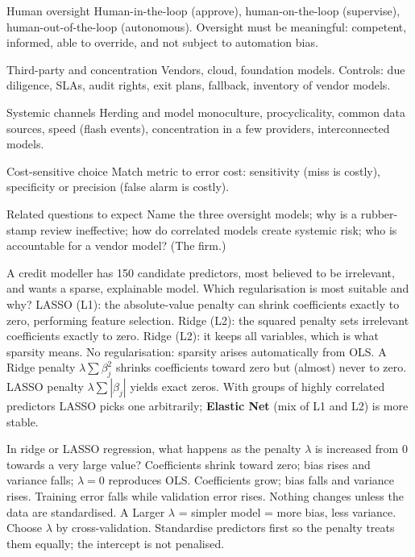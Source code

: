 {\begin{block}{Human oversight}
		Human-in-the-loop (approve), human-on-the-loop (supervise), human-out-of-the-loop (autonomous). Oversight must be meaningful: competent, informed, able to override, and not subject to automation bias.
	\end{block}
	\begin{block}{Third-party and concentration}
		Vendors, cloud, foundation models. Controls: due diligence, SLAs, audit rights, exit plans, fallback, inventory of vendor models.
\end{block}}
{\begin{block}{Systemic channels}
		Herding and model monoculture, procyclicality, common data sources, speed (flash events), concentration in a few providers, interconnected models.
	\end{block}
	\begin{block}{Cost-sensitive choice}
		Match metric to error cost: sensitivity (miss is costly), specificity or precision (false alarm is costly).
	\end{block}
	\begin{alertblock}{Related questions to expect}
		Name the three oversight models; why is a rubber-stamp review ineffective; how do correlated models create systemic risk; who is accountable for a vendor model? (The firm.)
\end{alertblock}}

{A credit modeller has 150 candidate predictors, most believed to be irrelevant, and wants a sparse, explainable model. Which regularisation is most suitable and why?}
{LASSO (L1): the absolute-value penalty can shrink coefficients exactly to zero, performing feature selection.}
{Ridge (L2): the squared penalty sets irrelevant coefficients exactly to zero.}
{Ridge (L2): it keeps all variables, which is what sparsity means.}
{No regularisation: sparsity arises automatically from OLS.}
{A}
{Ridge penalty $\lambda\sum\beta_j^2$ shrinks coefficients toward zero but (almost) never to zero. LASSO penalty $\lambda\sum|\beta_j|$ yields exact zeros. With groups of highly correlated predictors LASSO picks one arbitrarily; \textbf{Elastic Net} (mix of L1 and L2) is more stable.}

{In ridge or LASSO regression, what happens as the penalty $\lambda$ is increased from 0 towards a very large value?}
{Coefficients shrink toward zero; bias rises and variance falls; $\lambda=0$ reproduces OLS.}
{Coefficients grow; bias falls and variance rises.}
{Training error falls while validation error rises.}
{Nothing changes unless the data are standardised.}
{A}
{Larger $\lambda$ = simpler model = more bias, less variance. Choose $\lambda$ by cross-validation. Standardise predictors first so the penalty treats them equally; the intercept is not penalised.}

